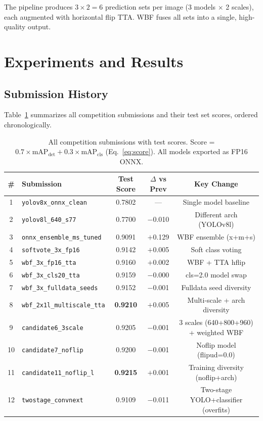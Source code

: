 \documentclass[11pt,a4paper]{article}
\begin{document}
The pipeline produces $3 \times 2 = 6$ prediction sets per image (3 models $\times$ 2 scales), each augmented with horizontal flip TTA.
WBF fuses all sets into a single, high-quality output.

\section{Experiments and Results}
\label{sec:results}

\subsection{Submission History}

Table~\ref{tab:submissions} summarizes all competition submissions and their test set scores, ordered chronologically.

\begin{table}[H]
\centering
\caption{All competition submissions with test scores. Score = $0.7 \times \text{mAP}_{\text{det}} + 0.3 \times \text{mAP}_{\text{cls}}$ (Eq.~\ref{eq:score}). All models exported as FP16 ONNX.}
\label{tab:submissions}
\small
\begin{tabular}{@{}clccc@{}}
\toprule
\textbf{\#} & \textbf{Submission} & \textbf{Test Score} & \textbf{$\Delta$ vs Prev} & \textbf{Key Change} \\
\midrule
1 & \texttt{yolov8x\_onnx\_clean}       & 0.7802 & ---     & Single model baseline \\
2 & \texttt{yolov8l\_640\_s77}           & 0.7700 & $-$0.010 & Different arch (YOLOv8l) \\
3 & \texttt{onnx\_ensemble\_ms\_tuned}   & 0.9091 & $+$0.129 & WBF ensemble (x+m+s) \\
4 & \texttt{softvote\_3x\_fp16}          & 0.9142 & $+$0.005 & Soft class voting \\
5 & \texttt{wbf\_3x\_fp16\_tta}          & 0.9160 & $+$0.002 & WBF + TTA hflip \\
6 & \texttt{wbf\_3x\_cls20\_tta}         & 0.9159 & $-$0.000 & cls=2.0 model swap \\
7 & \texttt{wbf\_3x\_fulldata\_seeds}    & 0.9152 & $-$0.001 & Fulldata seed diversity \\
8 & \texttt{wbf\_2x1l\_multiscale\_tta}  & \textbf{0.9210} & $+$0.005 & Multi-scale + arch diversity \\
9 & \texttt{candidate6\_3scale}           & 0.9205 & $-$0.001 & 3 scales (640+800+960) + weighted WBF \\
10 & \texttt{candidate7\_noflip}          & 0.9200 & $-$0.001 & Noflip model (flipud=0.0) \\
11 & \texttt{candidate11\_noflip\_l}      & \textbf{0.9215} & $+$0.001 & Training diversity (noflip+arch) \\
12 & \texttt{twostage\_convnext}          & 0.9109 & $-$0.011 & Two-stage YOLO+classifier (overfits) \\
\bottomrule
\end{tabular}
\end{table}
\end{document}
